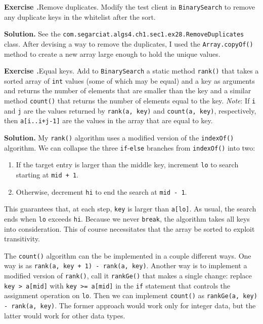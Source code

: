 \documentclass[12pt, a4paper]{article}
\newenvironment{ex}[2][Exercise]
{\par\medskip\noindent \textbf{#1 #2.}}
{\medskip}
\newenvironment{sol}[1][Solution]
{\par\medskip\noindent \textbf{#1.} }
{\medskip}
\begin{document}
	\begin{ex}{28}
		\emph{Remove duplicates}. Modify the test client in \texttt{BinarySearch} to remove
		any duplicate keys in the whitelist after the sort.
	\end{ex}
	\begin{sol}
		See the \texttt{com.segarciat.algs4.ch1.sec1.ex28.RemoveDuplicates} class.
		After devising a way to remove the duplicates, I used the \texttt{Array.copyOf()}
		method to create a new array large enough to hold the unique values.
	\end{sol}
	\begin{ex}{29}
		\emph{Equal keys}. Add to \texttt{BinarySearch} a static method \texttt{rank()}
		that takes a sorted array of \texttt{int} values (some of which may be equal) and
		a key as arguments and returns the number of elements that are smaller than the key
		and a similar  method \texttt{count()} that returns the number of elements equal
		to the key. \emph{Note}: If \texttt{i} and \texttt{j} are the values returned by
		\texttt{rank(a, key)} and \texttt{count(a, key)}, respectively, then \texttt{a[i..i+j-1]}
		are the values in the array that are equal to key.
	\end{ex}
	\begin{sol}
		My \texttt{rank()} algorithm uses a modified version of the \texttt{indexOf()}
		algorithm. We can collapse the three \texttt{if}-\texttt{else} branches
		from \texttt{indexOf()} into two:
		\begin{enumerate}[label=(\roman*)]
			\item If the target entry is larger than the middle key, increment \texttt{lo}
			to search starting at \texttt{mid + 1}.
			\item Otherwise, decrement \texttt{hi} to end the search at \texttt{mid - 1}.
		\end{enumerate}
		This guarantees that, at each step, \texttt{key} is larger than \texttt{a[lo]}.
		As usual, the search ends when \texttt{lo} exceeds \texttt{hi}. Because we never
		\texttt{break}, the algorithm takes all keys into consideration. This of course
		necessitates that the array be sorted to exploit transitivity.
		
		The \texttt{count()} algorithm can the be implemented in a couple different ways.
		One way is as \texttt{rank(a, key + 1) - rank(a, key)}. Another way is to implement
		a modified version of \texttt{rank()}, call it \texttt{rankGe()} that makes a single
		change: replace \texttt{key > a[mid]} with \texttt{key >= a[mid]} in the \texttt{if}
		statement that controls the assignment operation on \texttt{lo}. Then we can implement
		\texttt{count()} as \texttt{rankGe(a, key) - rank(a, key)}. The former approach would
		work only for integer data, but the latter would work for other data types.
	\end{sol}
	\pagebreak
	\printbibliography
\end{document}
